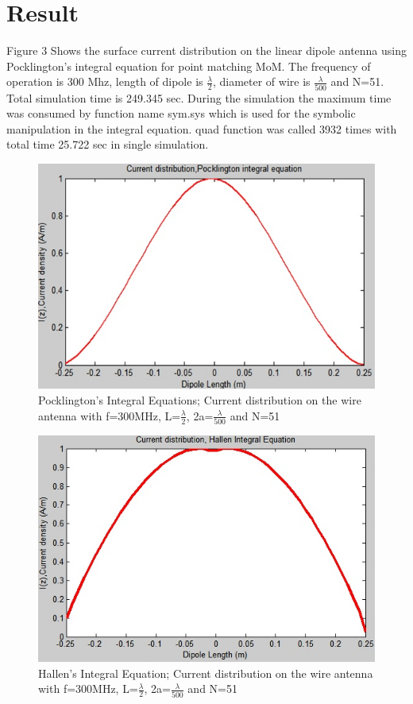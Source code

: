 \documentclass[aps,prstab,twocolumn,superscriptaddress,groupedaddress,showkeys,nofootinbib]{revtex4}  %
\begin{document}
\section{Result}
Figure 3 Shows the surface current distribution on the linear dipole antenna using Pocklington's integral equation for point matching MoM. The frequency of operation is 300 Mhz, length of dipole is $\frac{\lambda }{2}$, diameter of wire is $\frac{\lambda }{500}$ and N=51.\\
Total simulation time is 249.345 sec. During the simulation the maximum time was consumed by function name sym.sys which is used for the symbolic manipulation in the integral equation. quad function was called 3932 times with total time 25.722 sec in single simulation. 
\begin{figure}[here!]
\centering
\includegraphics[scale=0.5]{image3.jpg}
\caption{Pocklington's Integral Equations; Current distribution on the wire antenna with f=300MHz, L=$\frac{\lambda }{2}$, 2a=$\frac{\lambda }{500}$ and N=51}
\end{figure}
\begin{figure}[here!]
\centering
\includegraphics[scale=0.5]{image4.jpg}
\caption{Hallen's Integral Equation; Current distribution on the wire antenna with f=300MHz, L=$\frac{\lambda }{2}$, 2a=$\frac{\lambda }{500}$ and N=51}
\end{figure}
\end{document}
